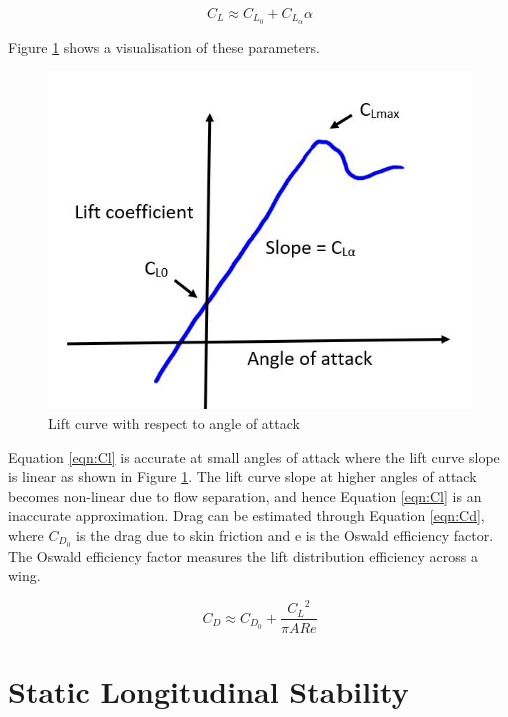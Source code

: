 \begin{equation}
    C_L \approx C_{L_0} + C_{L_\alpha}\alpha
    \label{eqn:Cl}
\end{equation}

Figure \ref{fig:Clalpha} shows a visualisation of these parameters. 

\begin{figure}[H]
    \centering
    \includegraphics[scale = 0.6]{02_Background/Figs/liftcurveslope.JPG}
    \caption{Lift curve with respect to angle of attack}
    \label{fig:Clalpha}
\end{figure}

Equation \ref{eqn:Cl} is accurate at small angles of attack where the lift curve slope is linear as shown in Figure \ref{fig:Clalpha}. The lift curve slope at higher angles of attack becomes non-linear due to flow separation, and hence Equation \ref{eqn:Cl} is an inaccurate approximation. Drag can be estimated through Equation \ref{eqn:Cd}, where $C_{D_0}$ is the drag due to skin friction and e is the Oswald efficiency factor. The Oswald efficiency factor measures the lift distribution efficiency across a wing. 


\begin{equation}
    C_D \approx C_{D_0} + \frac{{C_L}^2}{\pi ARe}
    \label{eqn:Cd}
\end{equation}



\section{Static Longitudinal Stability}

